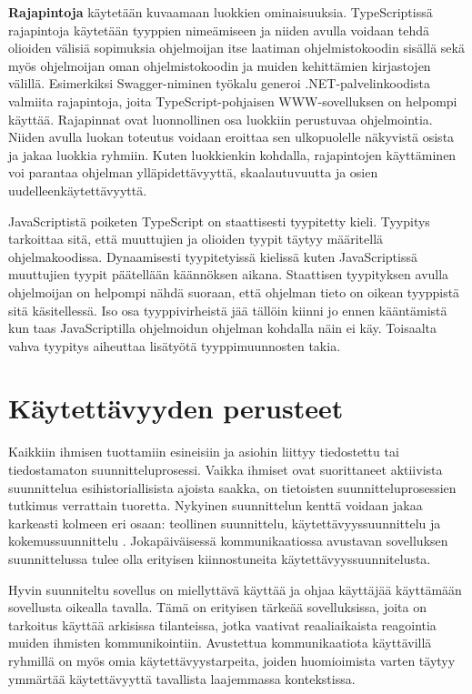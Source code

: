 \documentclass[utf8]{gradu3}
\begin{document}
\textbf{Rajapintoja} käytetään kuvaamaan luokkien ominaisuuksia. TypeScriptissä rajapintoja käytetään tyyppien nimeämiseen ja niiden avulla voidaan tehdä olioiden välisiä sopimuksia ohjelmoijan itse laatiman ohjelmistokoodin sisällä sekä myös ohjelmoijan oman ohjelmistokoodin ja muiden kehittämien kirjastojen välillä. \parencite[]{typescript-interfaces} Esimerkiksi Swagger-niminen työkalu generoi .NET-palvelinkoodista valmiita rajapintoja, joita TypeScript-pohjaisen WWW-sovelluksen on helpompi käyttää. Rajapinnat ovat luonnollinen osa luokkiin perustuvaa ohjelmointia. Niiden avulla luokan toteutus voidaan eroittaa sen ulkopuolelle näkyvistä osista ja jakaa luokkia ryhmiin. Kuten luokkienkin kohdalla, rajapintojen käyttäminen voi parantaa ohjelman ylläpidettävyyttä, skaalautuvuutta ja osien uudelleenkäytettävyyttä.

JavaScriptistä poiketen TypeScript on staattisesti tyypitetty kieli. Tyypitys tarkoittaa sitä, että muuttujien ja olioiden tyypit täytyy määritellä ohjelmakoodissa. Dynaamisesti tyypitetyissä kielissä kuten JavaScriptissä muuttujien tyypit päätellään käännöksen aikana. Staattisen tyypityksen avulla ohjelmoijan on helpompi nähdä suoraan, että ohjelman tieto on oikean tyyppistä sitä käsitellessä. Iso osa tyyppivirheistä jää tällöin kiinni jo ennen kääntämistä kun taas JavaScriptilla ohjelmoidun ohjelman kohdalla näin ei käy. Toisaalta vahva tyypitys aiheuttaa lisätyötä tyyppimuunnosten takia.

\section{Käytettävyyden perusteet}

Kaikkiin ihmisen tuottamiin esineisiin ja asiohin liittyy tiedostettu tai tiedostamaton suunnitteluprosessi. Vaikka ihmiset ovat suorittaneet aktiivista suunnittelua esihistoriallisista ajoista saakka, on tietoisten suunnitteluprosessien tutkimus verrattain tuoretta. Nykyinen suunnittelun kenttä voidaan jakaa karkeasti kolmeen eri osaan: teollinen suunnittelu, käytettävyyssuunnittelu ja kokemussuunnittelu \parencite[]{norman-doet}. Jokapäiväisessä kommunikaatiossa avustavan sovelluksen suunnittelussa tulee olla erityisen kiinnostuneita käytettävyyssuunnitelusta.

Hyvin suunniteltu sovellus on miellyttävä käyttää ja ohjaa käyttäjää käyttämään sovellusta oikealla tavalla. Tämä on erityisen tärkeää sovelluksissa, joita on tarkoitus käyttää arkisissa tilanteissa, jotka vaativat reaaliaikaista reagointia muiden ihmisten kommunikointiin. Avustettua kommunikaatiota käyttävillä ryhmillä on myös omia käytettävyystarpeita, joiden huomioimista varten täytyy ymmärtää käytettävyyttä tavallista laajemmassa kontekstissa.
\end{document}
